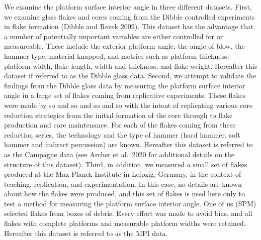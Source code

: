 \documentclass[10pt,letterpaper]{article}
\begin{document}
We examine the platform surface interior angle in three different
datasets. First, we examine glass flakes and cores coming from the
Dibble controlled experiments in flake formation (Dibble and Rezek
2009). This dataset has the advantage that a number of potentially
important variables are either controlled for or measureable. These
include the exterior platform angle, the angle of blow, the hammer type,
material knapped, and metrics such as platform thickness, platform
width, flake length, width and thickness, and flake weight. Hereafter
this dataset if referred to as the Dibble glass data. Second, we attempt
to validate the findings from the Dibble glass data by measuring the
platform surface interior angle in a large set of flakes coming from
replicative experiments. These flakes were made by so and so and so and
so with the intent of replicating various core reduction strategies from
the initial formation of the core through to flake production and core
maintenance. For each of the flakes coming from these reduction series,
the technology and the type of hammer (hard hammer, soft hammer and
indirect percussion) are known. Hereafter this dataset is referred to as
the Campagne data (see Archer et al.~2020 for additional details on the
structure of this dataset). Third, in addition, we measured a small set
of flakes produced at the Max Planck Institute in Leipzig, Germany, in
the context of teaching, replication, and experimentation. In this case,
no details are known about how the flakes were produced, and this set of
flakes is used here only to test a method for measuring the platform
surface interior angle. One of us (SPM) selected flakes from boxes of
debris. Every effort was made to avoid bias, and all flakes with
complete platforms and measurable platform widths were retained.
Hereafter this dataset is referred to as the MPI data.
\end{document}

